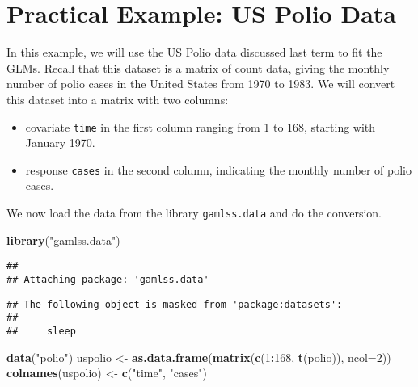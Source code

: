 \documentclass[
  12pt,
]{book}
\newenvironment{Shaded}{\begin{snugshade}}{\end{snugshade}}
\newcommand{\AttributeTok}[1]{\textcolor[rgb]{0.13,0.29,0.53}{#1}}
\newcommand{\DecValTok}[1]{\textcolor[rgb]{0.00,0.00,0.81}{#1}}
\newcommand{\FunctionTok}[1]{\textcolor[rgb]{0.13,0.29,0.53}{\textbf{#1}}}
\newcommand{\NormalTok}[1]{#1}
\newcommand{\OtherTok}[1]{\textcolor[rgb]{0.56,0.35,0.01}{#1}}
\newcommand{\SpecialCharTok}[1]{\textcolor[rgb]{0.81,0.36,0.00}{\textbf{#1}}}
\newcommand{\StringTok}[1]{\textcolor[rgb]{0.31,0.60,0.02}{#1}}
\providecommand{\tightlist}{%
  \setlength{\itemsep}{0pt}\setlength{\parskip}{0pt}}
\begin{document}
\section{Practical Example: US Polio Data}\label{practical-example-us-polio-data}

In this example, we will use the US Polio data discussed last term to fit the GLMs. Recall that this dataset is a matrix of count data, giving the monthly number of polio cases in the United States from 1970 to 1983. We will convert this dataset into a matrix with two columns:

\begin{itemize}
\tightlist
\item
  covariate \texttt{time} in the first column ranging from 1 to 168, starting with January 1970.
\item
  response \texttt{cases} in the second column, indicating the monthly number of polio cases.
\end{itemize}

We now load the data from the library \texttt{gamlss.data} and do the conversion.

\begin{Shaded}
\begin{Highlighting}[]
\FunctionTok{library}\NormalTok{(}\StringTok{"gamlss.data"}\NormalTok{)}
\end{Highlighting}
\end{Shaded}

\begin{verbatim}
## 
## Attaching package: 'gamlss.data'
\end{verbatim}

\begin{verbatim}
## The following object is masked from 'package:datasets':
## 
##     sleep
\end{verbatim}

\begin{Shaded}
\begin{Highlighting}[]
\FunctionTok{data}\NormalTok{(}\StringTok{"polio"}\NormalTok{)}
\NormalTok{uspolio }\OtherTok{\textless{}{-}} \FunctionTok{as.data.frame}\NormalTok{(}\FunctionTok{matrix}\NormalTok{(}\FunctionTok{c}\NormalTok{(}\DecValTok{1}\SpecialCharTok{:}\DecValTok{168}\NormalTok{, }\FunctionTok{t}\NormalTok{(polio)), }\AttributeTok{ncol=}\DecValTok{2}\NormalTok{))}
\FunctionTok{colnames}\NormalTok{(uspolio) }\OtherTok{\textless{}{-}} \FunctionTok{c}\NormalTok{(}\StringTok{"time"}\NormalTok{, }\StringTok{"cases"}\NormalTok{)}
\end{Highlighting}
\end{Shaded}
\end{document}

